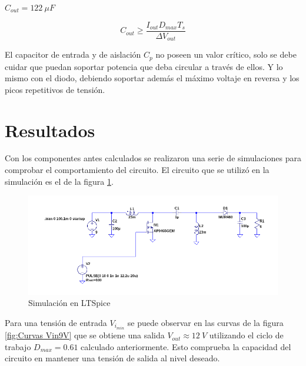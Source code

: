             $C_{out} = 122~\mu F$
            
            \begin{equation}
                C_{out} \geq \frac{I_{out}D_{max}T_s}{\Delta V_{out}}
                \label{ec : Capacitor de salida }
            \end{equation}
        
            El capacitor de entrada y de aislación $C_p$ no poseen un valor crítico, solo se debe cuidar que puedan soportar potencia que deba circular a través de ellos. Y lo mismo con el diodo, debiendo soportar además el máximo voltaje en reversa y los picos repetitivos de tensión.
        
        
        
\section{Resultados}
 
 
    Con los componentes antes calculados se realizaron una serie de simulaciones para comprobar el comportamiento del circuito. El circuito que se utilizó en la simulación es el de la figura \ref{fig: Circuito simulación}. 
    
     \begin{figure}[htbp]
            \centering
             \includegraphics[scale = 0.3]{Figuras/Circuito_simulacion.png}
            \caption{Simulación en LTSpice}
            \label{fig: Circuito simulación}
      \end{figure}
    
    Para una tensión de entrada $V_{i_{min}}$ se puede observar en las curvas de la figura \ref{fig:Curvas Vin9V}  que se obtiene una salida $V_{out} \approx 12~V$ utilizando el ciclo de trabajo $D_{max} = 0.61$ calculado anteriormente. Esto comprueba la capacidad del circuito en mantener una tensión de salida al nivel deseado. 
    
